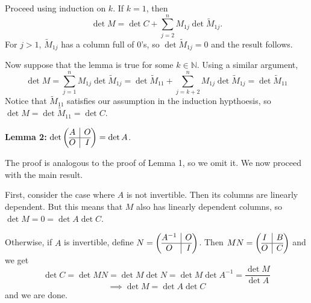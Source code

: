\documentclass{eh-homework}
\begin{document}
\begin{question}{6}
    Proceed using induction on \(k\). If \(k = 1\), then
    \[
        \det M = \det C + \sum_{j=2}^{n} M_{1j} \det \tilde{M}_{1j}.
    \]
    For \(j > 1\), \(\tilde{M}_{1j}\) has a column full of 0's, so \(\det \tilde{M}_{1j} = 0\) and the result follows.

    Now suppose that the lemma is true for some \(k \in \mathbb{N}\). Using a similar argument,
    \[
        \det M = \sum_{j=1}^{n} M_{1j} \det \tilde{M}_{1j} = \det \tilde{M}_{11} + \sum_{j=k+2}^{n} M_{1j} \det \tilde{M}_{1j} = \det \tilde{M}_{11}
    \]
    Notice that \(\tilde{M}_{11}\) satisfies our assumption in the induction hypthoesis, so \(\det M = \det \tilde{M}_{11} = \det C\).

    \medskip

    \textbf{Lemma 2:} \(\det \left( \begin{array}{@{}c|c@{}}
        A & O \\
        \hline
        O & I
    \end{array} \right) = \det A\).

    The proof is analogous to the proof of Lemma 1, so we omit it. We now proceed with the main result.

    First, consider the case where \(A\) is not invertible. Then its columns are linearly dependent. But this means that \(M\) also has linearly dependent columns, so \(\det M = 0 = \det A \det C\).

    Otherwise, if \(A\) is invertible, define \(N = \left( \begin{array}{@{}c|c@{}}
        A^{-1} & O \\
        \hline
        O & I
    \end{array} \right)\). Then \(MN = \left( \begin{array}{@{}c|c@{}}
            I & B \\
            \hline
            O & C
        \end{array} \right)\) and we get
    \[
        \det C = \det MN = \det M \det N = \det M \det A^{-1} = \frac{\det M}{\det A}
    \]
    \[
        \implies \det M = \det A \det C
    \]
    and we are done.
    \end{question}
    
\end{document}
